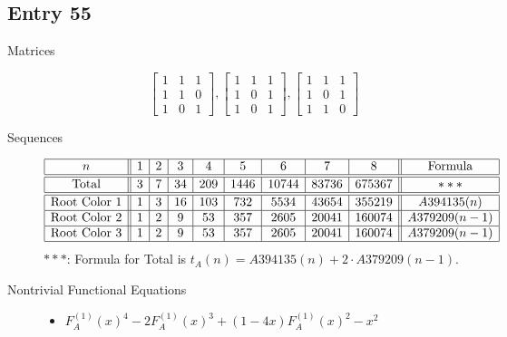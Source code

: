 \documentclass[12pt]{amsart}
\newcommand{\gff}[2]{F_{#2}^{(#1)}(x)}
\newcommand{\gfa}[1]{\gff{#1}{A}}
\begin{document}
\subsection*{Entry 55}
\begin{description}
    \item[Matrices]
    
    \[\begin{bmatrix}
1 & 1 & 1 \\
1 & 1 & 0 \\
1 & 0 & 1
\end{bmatrix}, \begin{bmatrix}
1 & 1 & 1 \\
1 & 0 & 1 \\
1 & 0 & 1
\end{bmatrix}, \begin{bmatrix}
1 & 1 & 1 \\
1 & 0 & 1 \\
1 & 1 & 0
\end{bmatrix}\]
    \item[Sequences]\hspace*{\fill}\vspace{-0.5cm}
    \begin{center}
        \[
        \begin{array}{|c||c|c|c|c|c|c|c|c||c|}\hline
           n  & 1 & 2 & 3 & 4 & 5 & 6 & 7 & 8  & \text{Formula}\\\hline\hline
           \text{Total}  & 3 & 7 & 34 & 209 & 1446 & 10744 & 83736 & 675367 & ***\\\hline\hline
           \text{Root Color }1 & 1 & 3 & 16 & 103 & 732 & 5534 & 43654 & 355219 & A394135(n) \\\hline
           \text{Root Color }2 & 1 & 2 & 9 & 53 & 357 & 2605 & 20041 & 160074 & A379209(n-1)\\\hline
           \text{Root Color }3 & 1 & 2 & 9 & 53 & 357 & 2605 & 20041 & 160074 & A379209(n-1)\\\hline
        \end{array}
        \]
        $***$: Formula for Total is $t_A(n)=A394135(n)+2\cdot A379209(n-1)$.
    \end{center}
    
    \item[Nontrivial Functional Equations]\hspace*{\fill}

    \begin{itemize}
\item $\gfa{1}^4-2\gfa{1}^3+(1 - 4x)\gfa{1}^2-x^2$



\end{itemize}
\end{description}
\end{document}
